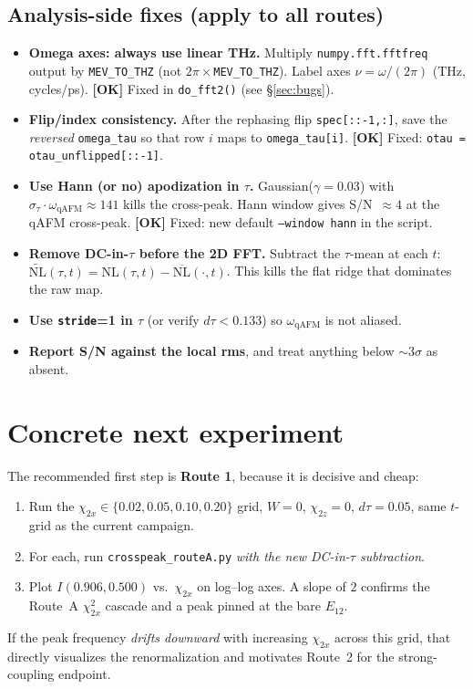\documentclass[11pt,a4paper]{article}
\newcommand{\qAFM}{\mathrm{qAFM}}
\newcommand{\EtA}{E_{12}}
\newcommand{\chitwox}{\chi_{2x}}
\newcommand{\chitwoz}{\chi_{2z}}
\newcommand{\PASS}{\textcolor{passgreen}{\textbf{[OK]}}}
\begin{document}
\subsection{Analysis-side fixes (apply to all routes)}
\begin{itemize}[nosep]
  \item \textbf{Omega axes: always use linear THz.}
        Multiply \texttt{numpy.fft.fftfreq} output by \texttt{MEV\_TO\_THZ}
        (not $2\pi\times$\texttt{MEV\_TO\_THZ}). Label axes
        $\nu=\omega/(2\pi)$ (THz, cycles/ps).
        \PASS{} Fixed in \texttt{do\_fft2()} (see \S\ref{sec:bugs}).
  \item \textbf{Flip/index consistency.} After the rephasing flip
        \texttt{spec[::-1,:]}, save the \emph{reversed} \texttt{omega\_tau}
        so that row $i$ maps to \texttt{omega\_tau[i]}.
        \PASS{} Fixed: \texttt{otau = otau\_unflipped[::-1]}.
  \item \textbf{Use Hann (or no) apodization in $\tau$.}
        Gaussian($\gamma=0.03$) with
        $\sigma_\tau\cdot\omega_\qAFM\approx 141$ kills the cross-peak.
        Hann window gives S/N~$\approx 4$ at the qAFM cross-peak.
        \PASS{} Fixed: new default \texttt{--window hann} in the script.
  \item \textbf{Remove DC-in-$\tau$ before the 2D FFT.} Subtract the
        $\tau$-mean at each $t$:
        $\widetilde{\mathrm{NL}}(\tau,t)=\mathrm{NL}(\tau,t)-\overline{\mathrm{NL}}(\cdot,t)$.
        This kills the flat ridge that dominates the raw map.
  \item \textbf{Use \texttt{stride}=1 in $\tau$} (or verify $d\tau<0.133$) so
        $\omega_{\qAFM}$ is not aliased.
  \item \textbf{Report S/N against the local rms}, and treat anything below
        $\sim 3\sigma$ as absent.
\end{itemize}

\section{Concrete next experiment}

The recommended first step is \textbf{Route 1}, because it is decisive and
cheap:
\begin{enumerate}[nosep]
  \item Run the $\chitwox\in\{0.02,0.05,0.10,0.20\}$ grid, $W=0$, $\chitwoz=0$,
        $d\tau=0.05$, same $t$-grid as the current campaign.
  \item For each, run \texttt{crosspeak\_routeA.py} \emph{with the new
        DC-in-$\tau$ subtraction}.
  \item Plot $I(0.906,0.500)$ vs.\ $\chitwox$ on log--log axes.
        A slope of $2$ confirms the Route~A $\chitwox^2$ cascade and a peak
        pinned at the bare $\EtA$.
\end{enumerate}
If the peak frequency \emph{drifts downward} with increasing $\chitwox$ across
this grid, that directly visualizes the renormalization and motivates Route~2
for the strong-coupling endpoint.
\end{document}
